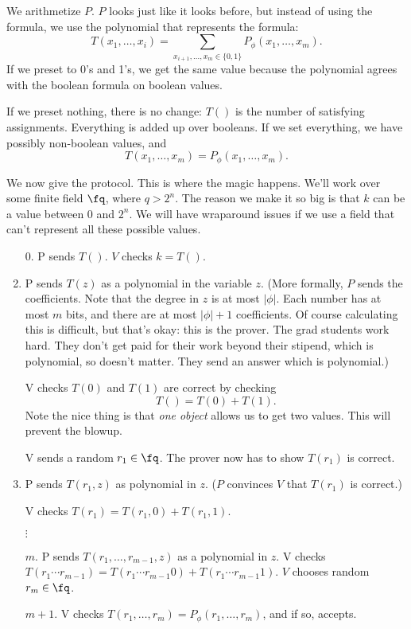 We arithmetize $P$. $P$ looks just like it looks before, but instead of using the formula, we use the polynomial that represents the formula:
\[
T(x_1,\ldots, x_i)=\sum_{x_{i+1},\ldots, x_m\in \{0,1\}} P_{\phi}(x_1,\ldots, x_m).
\]
If we preset to 0's and 1's, we get the same value because the polynomial agrees with the boolean formula on boolean values.

If we preset nothing, there is no change: $T()$ is the number of satisfying assignments. Everything is added up over booleans. If we set everything, we have possibly non-boolean values, and
\[
T(x_1,\ldots, x_m)=P_{\phi}(x_1,\ldots, x_m).
\]

We now give the protocol. This is where the magic happens. We'll work over some finite field $\fq$, where $q> 2^n$. The reason we make it so big is that $k$ can be a value between 0 and $2^n$. We will have wraparound issues if we use a field that can't represent all these possible values.
\begin{enumerate}
\item[0.]
P sends $T()$. $V$ checks $k=T()$.
\item
P sends $T(z)$ as a polynomial in the variable $z$. %
(More formally, $P$ sends the coefficients. 
Note that the degree in $z$ is at most $|\phi|$. Each number has at most $m$ bits, and there are at most $|\phi|+1$ coefficients. Of course calculating this is difficult, but that's okay: this is the prover. The grad students work hard. They don't get paid for their work beyond their stipend, which is polynomial, so doesn't matter. They send an answer which is polynomial.) 

V checks $T(0)$ and $T(1)$ are correct by checking
\[
T()=T(0)+T(1).
\]
Note the nice thing is that {\it one object} allows us to get two values.
This will prevent the blowup.

V sends a random $r_1\in \fq$. 
The prover now has to show $T(r_1)$ is correct. %
\item
P sends $T(r_1,z)$ as polynomial in $z$. ($P$ convinces $V$ that $T(r_1)$ is correct.)

V checks $T(r_1)=T(r_1,0)+T(r_1,1)$. %

$\vdots$
\item[$m$.] P sends $T(r_1,\ldots, r_{m-1},z)$ as a polynomial in $z$.
V checks $T(r_1\cdots r_{m-1})=T(r_1\cdots r_{m-1}0)+T(r_1\cdots r_{m-1}1)$. $V$ chooses random $r_m\in \fq$. %
\item[$m+1$.] V checks $T(r_1,\ldots, r_m)=P_{\phi}(r_1,\ldots, r_m)$, and if so, accepts.
\end{enumerate}
